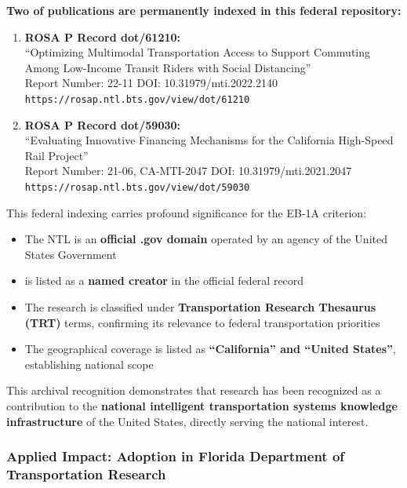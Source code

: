 \textbf{Two of \drs publications are permanently indexed in this federal repository:}

\begin{enumerate}
    \item \textbf{ROSA P Record dot/61210:} \\
    ``Optimizing Multimodal Transportation Access to Support Commuting Among Low-Income Transit Riders with Social Distancing'' \\
    Report Number: 22-11 \quad DOI: 10.31979/mti.2022.2140 \\
    \texttt{https://rosap.ntl.bts.gov/view/dot/61210}
    
    \item \textbf{ROSA P Record dot/59030:} \\
    ``Evaluating Innovative Financing Mechanisms for the California High-Speed Rail Project'' \\
    Report Number: 21-06, CA-MTI-2047 \quad DOI: 10.31979/mti.2021.2047 \\
    \texttt{https://rosap.ntl.bts.gov/view/dot/59030}
\end{enumerate}

This federal indexing carries profound significance for the EB-1A criterion:

\begin{itemize}
    \item The NTL is an \textbf{official .gov domain} operated by an agency of the United States Government
    \item \dr is listed as a \textbf{named creator} in the official federal record
    \item The research is classified under \textbf{Transportation Research Thesaurus (TRT)} terms, confirming its relevance to federal transportation priorities
    \item The geographical coverage is listed as \textbf{``California'' and ``United States''}, establishing national scope
\end{itemize}

This archival recognition demonstrates that \drs research has been recognized as a contribution to the \textbf{national intelligent transportation systems knowledge infrastructure} of the United States, directly serving the national interest.


\subsubsection{Applied Impact: Adoption in Florida Department of Transportation Research}
\label{scholar:florida_dot}


